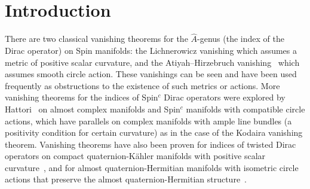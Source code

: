 \documentclass[pdftex]{sigma}
\newcommand{\A}{\mbox{$\widehat A$}}
\numberwithin{equation}{section}
\begin{document}
\allowdisplaybreaks

\newcommand{\arXivNumber}{1609.01509}

\renewcommand{\PaperNumber}{027}

\FirstPageHeading








\section{Introduction}

There are two classical vanishing theorems for the $\A$-genus (the index of the Dirac operator) on Spin manifolds: the Lichnerowicz vanishing \cite{Lichnerowicz} which assumes a metric of positive scalar curvature, and the Atiyah--Hirzebruch vanishing~\cite{AH} which assumes smooth circle action. These vanishings can be seen and have been used frequently as obstructions to the existence of such metrics or actions. More vanishing theorems for the indices of Spin$^c$ Dirac operators were explored by Hattori~\cite{Hattori} on almost complex manifolds and Spin$^c$ manifolds with compatible circle actions, which have parallels on complex manifolds with ample line bundles (a positivity condition for certain curvature) as in the case of the Kodaira vanishing theorem. Vanishing theorems have also been proven for indices of twisted Dirac operators on compact quaternion-K\"ahler manifolds with positive scalar curvature~\cite{LS}, and for almost quaternion-Hermitian manifolds with isometric circle actions that preserve the almost quaternion-Hermitian structure~\cite{Herrera-Herrera}.
\end{document}
